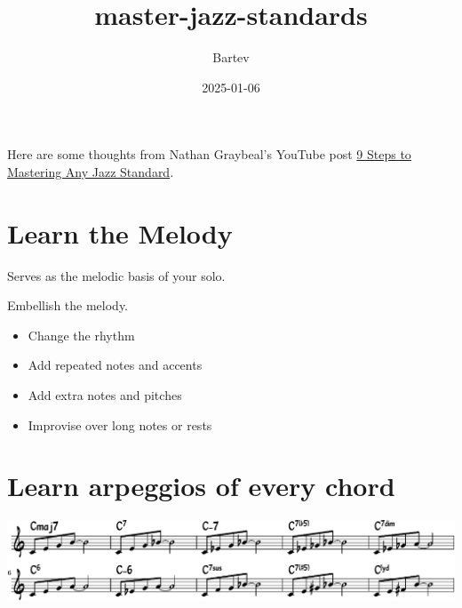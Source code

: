 \documentclass[11pt]{article}
\author{Bartev}
\date{2025-01-06}
\title{master-jazz-standards}
\let\maketitle\relax %
\begin{document}
\maketitle
Here are some thoughts from Nathan Graybeal's YouTube post \href{https://www.youtube.com/watch?v=qdobZsTTbbw\&list=LL}{9 Steps to Mastering Any Jazz Standard}.
\section*{Learn the Melody}
\label{sec:org3d9fd8a}

Serves as the melodic basis of your solo.

Embellish the melody.
\begin{itemize}
\item Change the rhythm
\item Add repeated notes and accents
\item Add extra notes and pitches
\item Improvise over long notes or rests
\end{itemize}
\section*{Learn arpeggios of every chord}
\label{sec:orgc92d7c5}

\begin{center}
\includegraphics[width=0.98\linewidth]{arpeggios.pdf}
\end{center}
\end{document}
